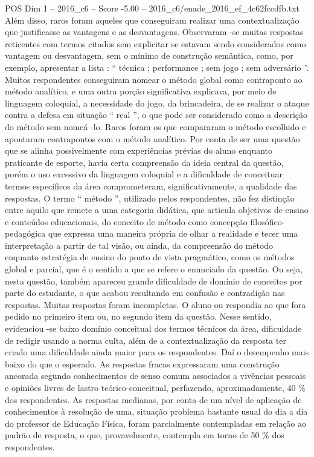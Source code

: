 \begin{textsample}{POS Dim 1 – 2016\_c6 – Score -5.00 – 2016\_c6/enade\_2016\_ef\_4c62fccdfb.txt}
Além disso, raros foram aqueles que conseguiram realizar uma contextualização que justificasse as vantagens e as desvantagens.
Observaram -se muitas respostas reticentes com termos citados sem explicitar se estavam sendo considerados como vantagem ou desvantagem, sem o mínimo de construção semântica, como, por exemplo, apresentar a lista : “ técnica ; performance ; sem jogo ; sem adversário ”.
Muitos respondentes conseguiram nomear o método global como contraponto ao método analítico, e uma outra porção significativa explicava, por meio de linguagem coloquial, a necessidade do jogo, da brincadeira, de se realizar o ataque contra a defesa em situação “ real ”, o que pode ser considerado como a descrição do método sem nomeá -lo.
Raros foram os que compararam o método escolhido e apontaram contrapontos com o método analítico.
Por conta de ser uma questão que se alinha possivelmente com experiências prévias do aluno enquanto praticante de esporte, havia certa compreensão da ideia central da questão, porém o uso excessivo da linguagem coloquial e a dificuldade de conceituar termos específicos da área comprometeram, significativamente, a qualidade das respostas.
O termo “ método ”, utilizado pelos respondentes, não fez distinção entre aquilo que remete a uma categoria didática, que articula objetivos de ensino e conteúdos educacionais, do conceito de método como concepção filosófico-pedagógica que expressa uma maneira própria de olhar a realidade e tecer uma interpretação a partir de tal visão, ou ainda, da compreensão do método enquanto estratégia de ensino do ponto de vista pragmático, como os métodos global e parcial, que é o sentido a que se refere o enunciado da questão.
Ou seja, nesta questão, também apareceu grande dificuldade de domínio de conceitos por parte do estudante, o que acabou resultando em confusão e contradição nas respostas.
Muitas respostas foram incompletas.
O aluno ou respondia ao que fora pedido no primeiro item ou, no segundo item da questão.
Nesse sentido, evidenciou -se baixo domínio conceitual dos termos técnicos da área, dificuldade de redigir usando a norma culta, além de a contextualização da resposta ter criado uma dificuldade ainda maior para os respondentes.
Daí o desempenho mais baixo do que o esperado.
As respostas fracas expressaram uma construção ancorada segundo conhecimentos de senso comum associados a vivências pessoais e opiniões livres de lastro teórico-conceitual, perfazendo, aproximadamente, 40 \% dos respondentes.
As respostas medianas, por conta de um nível de aplicação de conhecimentos à resolução de uma, situação problema bastante usual do dia a dia do professor de Educação Física, foram parcialmente contempladas em relação ao padrão de resposta, o que, provavelmente, contempla em torno de 50 \% dos respondentes.

\end{textsample}
